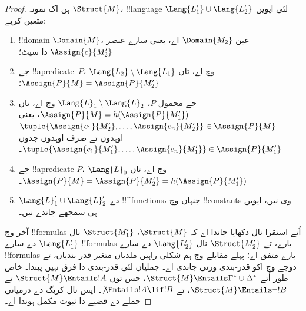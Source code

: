 \documentclass[../../../include/open-logic-section]{subfiles}
\begin{document}
\begin{proof}
ہن اک نمونہ $\Struct{M}$،
!!{language}
$\Lang{L'_1} \cup \Lang{L'_2}$ لئی
ایویں متعین کریے:
\begin{enumerate}
\item !!{domain} $\Domain{M}$،
  عین $\Domain{M_2}$ اے، یعنی سارے
  عنصر $\Assign{c}{M'_2}$ دا سیٹ؛
\item جے !!a{predicate}~$P$،
  $\Lang{L_2} \setminus
  \Lang{L_1}$ وچ اے، تاں
  $\Assign{P}{M} = \Assign{P}{M'_2}$؛
\item جے محمول $P$،
  $\Lang{L}_1\setminus \Lang{L}_2$
  وچ اے، تاں
  $\Assign{P}{M} = h(\Assign{P}{M'_1})$،
  یعنی $\tuple{\Assign{c_1}{M'_2}, \dots, \Assign{c_n}{M'_2}} \in
  \Assign{P}{M}$ اوہدوں تے صرف اوہدوں
  جدوں $\tuple{\Assign{c_1}{M'_1}, \dots,
  \Assign{c_n}{M'_1}} \in \Assign{P}{M'_1}$۔
\item جے !!a{predicate} $P$،
  $\Lang{L}_0$ وچ اے، تاں
  $\Assign{P}{M} =
  \Assign{P}{M'_2} = h(\Assign{P}{M'_1})$۔
\item $\Lang{L}'_1 \cup \Lang{L}'_2$
  دے !!^{function}s، جنہاں وچ
  !!{constant}s وی نیں، ایویں ہی
  سمجھے جاندے نیں۔
\end{enumerate}

آخر وچ !!{formula}s اُتے استقرا
نال دکھایا جاندا اے کہ
$\Struct{M}$، $\Struct{M'_1}$
نال $\Lang{L'_1}$ دے سارے
!!{formula}s بارے، تے
$\Struct{M'_2}$ نال
$\Lang{L'_2}$ دے سارے
!!{formula}s بارے متفق اے؛ پہلے مقابلے وچ ہم شکلی
راہیں ملدیاں متغیر قدر-بندیاں، تے دوجے وچ اکو قدر-بندی
ورتی جاندی اے۔ جملیاں لئی قدر-بندی دا فرق نہیں پیندا۔
خاص طور اُتے
$\Struct{M} \Entails \Gamma^* \cup \Delta^*$،
جس توں $\Struct{M}
\Entails !A$ تے
$\Struct{M} \Entails \lnot!B$،
تے $\not\Entails !A \lif !B$۔
ایس نال کریگ دے درمیانی جملے دے
قضیے دا ثبوت مکمل ہوندا اے۔
\end{proof}
\end{document}
